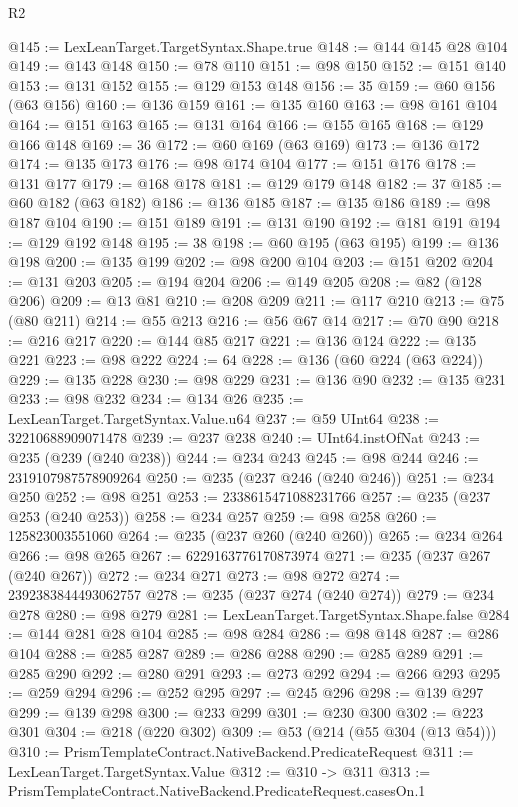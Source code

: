 \begin{lexlean}{R2}
\begin{coremodule}
@145 := LexLeanTarget.TargetSyntax.Shape.true
@148 := @144 @145 @28 @104
@149 := @143 @148
@150 := @78 @110
@151 := @98 @150
@152 := @151 @140
@153 := @131 @152
@155 := @129 @153 @148
@156 := 35
@159 := @60 @156 (@63 @156)
@160 := @136 @159
@161 := @135 @160
@163 := @98 @161 @104
@164 := @151 @163
@165 := @131 @164
@166 := @155 @165
@168 := @129 @166 @148
@169 := 36
@172 := @60 @169 (@63 @169)
@173 := @136 @172
@174 := @135 @173
@176 := @98 @174 @104
@177 := @151 @176
@178 := @131 @177
@179 := @168 @178
@181 := @129 @179 @148
@182 := 37
@185 := @60 @182 (@63 @182)
@186 := @136 @185
@187 := @135 @186
@189 := @98 @187 @104
@190 := @151 @189
@191 := @131 @190
@192 := @181 @191
@194 := @129 @192 @148
@195 := 38
@198 := @60 @195 (@63 @195)
@199 := @136 @198
@200 := @135 @199
@202 := @98 @200 @104
@203 := @151 @202
@204 := @131 @203
@205 := @194 @204
@206 := @149 @205
@208 := @82 (@128 @206)
@209 := @13 @81
@210 := @208 @209
@211 := @117 @210
@213 := @75 (@80 @211)
@214 := @55 @213
@216 := @56 @67 @14
@217 := @70 @90
@218 := @216 @217
@220 := @144 @85 @217
@221 := @136 @124
@222 := @135 @221
@223 := @98 @222
@224 := 64
@228 := @136 (@60 @224 (@63 @224))
@229 := @135 @228
@230 := @98 @229
@231 := @136 @90
@232 := @135 @231
@233 := @98 @232
@234 := @134 @26
@235 := LexLeanTarget.TargetSyntax.Value.u64
@237 := @59 UInt64
@238 := 32210688909071478
@239 := @237 @238
@240 := UInt64.instOfNat
@243 := @235 (@239 (@240 @238))
@244 := @234 @243
@245 := @98 @244
@246 := 2319107987578909264
@250 := @235 (@237 @246 (@240 @246))
@251 := @234 @250
@252 := @98 @251
@253 := 2338615471088231766
@257 := @235 (@237 @253 (@240 @253))
@258 := @234 @257
@259 := @98 @258
@260 := 125823003551060
@264 := @235 (@237 @260 (@240 @260))
@265 := @234 @264
@266 := @98 @265
@267 := 6229163776170873974
@271 := @235 (@237 @267 (@240 @267))
@272 := @234 @271
@273 := @98 @272
@274 := 2392383844493062757
@278 := @235 (@237 @274 (@240 @274))
@279 := @234 @278
@280 := @98 @279
@281 := LexLeanTarget.TargetSyntax.Shape.false
@284 := @144 @281 @28 @104
@285 := @98 @284
@286 := @98 @148
@287 := @286 @104
@288 := @285 @287
@289 := @286 @288
@290 := @285 @289
@291 := @285 @290
@292 := @280 @291
@293 := @273 @292
@294 := @266 @293
@295 := @259 @294
@296 := @252 @295
@297 := @245 @296
@298 := @139 @297
@299 := @139 @298
@300 := @233 @299
@301 := @230 @300
@302 := @223 @301
@304 := @218 (@220 @302)
@309 := @53 (@214 (@55 @304 (@13 @54)))
@310 := PrismTemplateContract.NativeBackend.PredicateRequest
@311 := LexLeanTarget.TargetSyntax.Value
@312 := @310 -> @311
@313 := PrismTemplateContract.NativeBackend.PredicateRequest.casesOn.{1}

\end{coremodule}
\end{lexlean}
